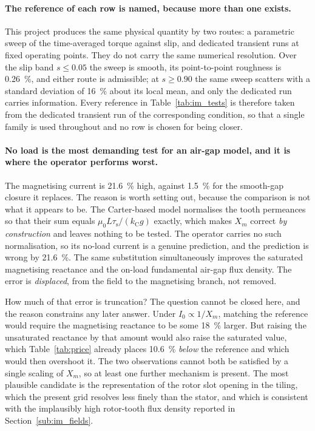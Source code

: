 \documentclass[10pt,a4paper,twocolumn]{article}
\theoremstyle{plain}
\theoremstyle{remark}
\begin{document}
\paragraph{The reference of each row is named, because more than one
exists.}
This project produces the same physical quantity by two routes: a
parametric sweep of the time-averaged torque against slip, and dedicated
transient runs at fixed operating points. They do not carry the same
numerical resolution. Over the slip band $s\le\num{0.05}$ the sweep is
smooth, its point-to-point roughness is \SI{0.26}{\percent}, and
either route is admissible; at $s\ge\num{0.90}$ the same sweep scatters
with a standard deviation of \SI{16}{\percent} about its local mean, and
only the dedicated run carries information. Every reference in
Table~\ref{tab:im_tests} is therefore taken from the dedicated transient
run of the corresponding condition, so that a single family is used
throughout and no row is chosen for being closer.

\paragraph{No load is the most demanding test for an air-gap model, and
it is where the operator performs worst.}
The magnetising current is \SI{21.6}{\percent} high, against
\SI{1.5}{\percent} for the smooth-gap closure it replaces. The reason is
worth setting out, because the comparison is not what it appears to be.
The Carter-based model normalises the tooth permeances so that their sum
equals $\mu_0 L\tau_{\mathrm{s}}/(k_{\mathrm{C}}g)$ exactly, which makes
$X_m$ correct \emph{by construction} and leaves nothing to be tested.
The operator carries no such normalisation, so its no-load current is a
genuine prediction, and the prediction is wrong by \SI{21.6}{\percent}.
The same substitution simultaneously improves the saturated magnetising
reactance and the on-load fundamental air-gap flux density. The error is
\emph{displaced}, from the field to the magnetising branch, not removed.

How much of that error is truncation? The question cannot be closed
here, and the reason constrains any later answer. Under
$I_0\propto1/X_m$, matching the reference would require the magnetising
reactance to be some \SI{18}{\percent} larger. But raising the
unsaturated reactance by that amount would also raise the saturated
value, which Table~\ref{tab:price} already places \SI{10.6}{\percent}
\emph{below} the reference and which would then overshoot it. The two
observations cannot both be satisfied by a single scaling of $X_m$, so
at least one further mechanism is present. The most plausible candidate
is the representation of the rotor slot opening in the tiling, which the
present grid resolves less finely than the stator, and which is
consistent with the implausibly high rotor-tooth flux density reported
in Section~\ref{sub:im_fields}.
\end{document}
